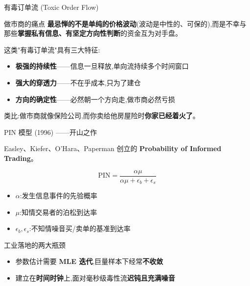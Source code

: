 \documentclass[10pt,aspectratio=169]{beamer}
\begin{document}
\begin{frame}{有毒订单流 (Toxic Order Flow)}

  \begin{exampleblock}{做市商的痛点}
    \textbf{最忌惮的不是单纯的价格波动}(波动是中性的、可保的),而是不幸与那些\textbf{掌握私有信息、有坚定方向性判断}的资金互为对手盘。
  \end{exampleblock}

  \vfill

  这类"有毒订单流"具有三大特征:

  \begin{itemize}
    \item \textbf{极强的持续性}——信息一旦释放,单向流持续多个时间窗口
    \item \textbf{强大的穿透力}——不在乎成本,只为了建仓
    \item \textbf{方向的确定性}——必然朝一个方向走,做市商必然亏损
  \end{itemize}

  \vfill

  \centering\small
  类比:做市商就像保险公司,而你卖给他房屋险时\textbf{你家已经着火了}。

\end{frame}

\begin{frame}{PIN 模型 (1996) ——开山之作}

  Easley、Kiefer、O'Hara、Paperman 创立的 \textbf{Probability of Informed Trading}。

  \vfill

  \[
    \text{PIN} = \frac{\alpha \mu}{\alpha \mu + \epsilon_b + \epsilon_s}
  \]

  \begin{itemize}
    \item $\alpha$:发生信息事件的先验概率
    \item $\mu$:知情交易者的泊松到达率
    \item $\epsilon_b, \epsilon_s$:不知情噪音买/卖单的基准到达率
  \end{itemize}

  \vfill

  \begin{alertblock}{工业落地的两大瓶颈}
    \begin{itemize}
      \item 参数估计需要 \textbf{MLE 迭代},巨量样本下经常\textbf{不收敛}
      \item 建立在\textbf{时间时钟}上,面对毫秒级毒性流\textbf{迟钝且充满噪音}
    \end{itemize}
  \end{alertblock}

\end{frame}
\end{document}
